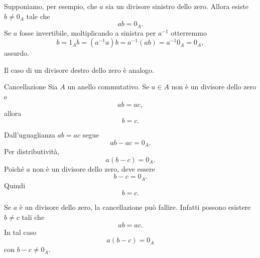 \documentclass[a4paper]{article}
\begin{document}
\begin{radioactive}
\begin{snippetproof}{}
    Supponiamo, per esempio, che \(a\) sia un divisore sinistro dello zero.
    Allora esiste \(b \neq 0_A\) tale che
    \[
        ab=0_A.
    \]
    Se \(a\) fosse invertibile, moltiplicando a sinistra per \(a^{-1}\) otterremmo
    \[
        b
        =
        1_Ab
        =
        (a^{-1}a)b
        =
        a^{-1}(ab)
        =
        a^{-1}0_A
        =
        0_A,
    \]
    assurdo.

    Il caso di un divisore destro dello zero è analogo.
\end{snippetproof}
\end{radioactive}

\begin{radioactive}
\begin{snippetproposition}{Cancellazione}
    Sia \(A\) un anello commutativo.
    Se \(a \in A\) non è un divisore dello zero e
    \[
        ab=ac,
    \]
    allora
    \[
        b=c.
    \]
\end{snippetproposition}
\end{radioactive}

\begin{radioactive}
\begin{snippetproof}{}
    Dall'uguaglianza \(ab=ac\) segue
    \[
        ab-ac=0_A.
    \]
    Per distributività,
    \[
        a(b-c)=0_A.
    \]
    Poiché \(a\) non è un divisore dello zero, deve essere
    \[
        b-c=0_A.
    \]
    Quindi
    \[
        b=c.
    \]
\end{snippetproof}
\end{radioactive}

\begin{radioactive}
\begin{snippetremark}{}
    Se \(a\) è un divisore dello zero, la cancellazione può fallire.
    Infatti possono esistere \(b \neq c\) tali che
    \[
        ab=ac.
    \]
    In tal caso
    \[
        a(b-c)=0_A
    \]
    con \(b-c \neq 0_A\).
\end{snippetremark}
\end{radioactive}
\end{document}
